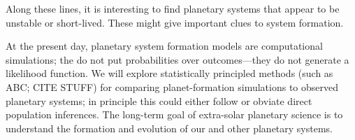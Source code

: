 \documentclass[12pt]{article}
\begin{document}
Along these lines, it is interesting to find planetary systems that
appear to be unstable or short-lived. These might give important clues
to system formation.

At the present day, planetary system formation models are
computational simulations; the do not put probabilities over
outcomes---they do not generate a likelihood function. We will explore
statistically principled methods (such as ABC; CITE STUFF) for
comparing planet-formation simulations to observed planetary systems;
in principle this could either follow or obviate direct population
inferences. The long-term goal of extra-solar planetary science is to
understand the formation and evolution of our and other planetary
systems.
\end{document}
